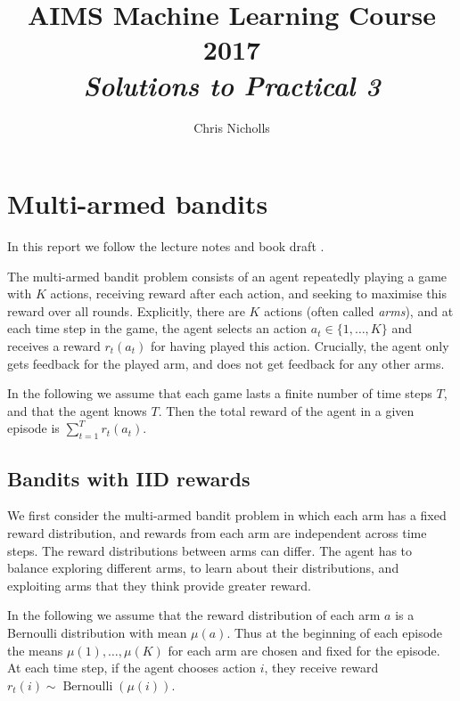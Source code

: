 \documentclass[10pt]{article}
\title{AIMS Machine Learning Course 2017 \\ \emph{Solutions to Practical 3}}
\author{Chris Nicholls}
\DeclareMathOperator{\Bernoulli}{Bernoulli}
\begin{document}
\maketitle

\section{Multi-armed bandits}
In this report we follow the lecture notes \cite{Kanade} and book draft
\cite{Slivkins}.

The multi-armed bandit problem consists of an agent repeatedly playing a game
with $K$ actions, receiving reward after each action, and seeking to maximise
this reward over all rounds. Explicitly, there are $K$ actions (often called
\emph{arms}), and at each time step in the game, the agent selects an action
$a_t \in \{1, \ldots, K\}$ and receives a reward $r_t(a_t)$ for having played
this action. Crucially, the agent only gets feedback for the played arm, and
does not get feedback for any other arms.

In the following we assume that each game lasts a finite number of time steps
$T$, and that the agent knows $T$. Then the total reward of the agent in a given
episode is $\sum_{t=1}^T r_t(a_t)$.

\subsection{Bandits with IID rewards}
We first consider the multi-armed bandit problem in which each arm has a fixed
reward distribution, and rewards from each arm are independent across time
steps. The reward distributions between arms can differ. The agent has to
balance exploring different arms, to learn about their distributions, and
exploiting arms that they think provide greater reward.

In the following we assume that the reward distribution of each arm $a$ is a
Bernoulli distribution with mean $\mu(a)$. Thus at the beginning of each episode
the means $\mu(1), \ldots, \mu(K)$ for each arm are chosen and fixed for the
episode. At each time step, if the agent chooses action $i$, they receive reward
$r_t(i) \sim \Bernoulli(\mu(i))$.
\end{document}
